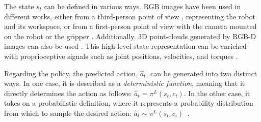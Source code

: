 The state $s_{t}$ can be defined in various ways. RGB images have been used in different works, either from a third-person point of view \cite{james2018task_embedded}, representing the robot and its workspace, or from a first-person point of view with the camera mounted on the robot \cite{jang2022bc_z} or the gripper \cite{mees2022calvin}. Additionally, 3D point-clouds generated by RGB-D images can also be used \cite{shridhar2023perceiver}. This high-level state representation can be enriched with proprioceptive signals such as joint positions, velocities, and torques \cite{zhang2018deep_vr_teleoperation}.

Regarding the policy, the predicted action, $\hat{a}_{t}$, can be generated into two distinct ways. In one case, it is described as a \textit{deterministic function}, meaning that it directly determines the action as follows: $\hat{a}_{t} = \pi^{L}(s_{t}, c_{i})$\cite{jang2022bc_z}. In the other case, it takes on a probabilistic definition, where it represents a probability distribution from which to sample the desired action: $\hat{a}_{t} \sim \pi^{L}(s_{t}, c_{i})$~\cite{mandi2022towards_more_generalizable_one_shot}.


